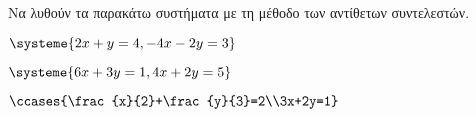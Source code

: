Να λυθούν τα παρακάτω συστήματα με τη μέθοδο των αντίθετων συντελεστών.
\begin{multicols}{2}
\begin{rlist}[leftmargin=5mm]
\item $ \systeme{2x+y=4,-4x-2y=3} $
\item $ \systeme{6x+3y=1,4x+2y=5} $
\item $ \ccases{\frac{x}{2}+\frac{y}{3}=2\\3x+2y=1} $
\end{rlist}
\end{multicols}
